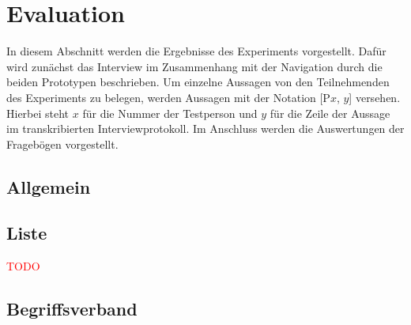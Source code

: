 \section{Evaluation}\label{sec:results}
In diesem Abschnitt werden die Ergebnisse des Experiments vorgestellt.
Dafür wird zunächst das Interview im Zusammenhang mit der Navigation durch die beiden Prototypen beschrieben.
Um einzelne Aussagen von den Teilnehmenden des Experiments zu belegen, werden Aussagen mit der Notation [P$x$, $y$] versehen.
Hierbei steht $x$ für die Nummer der Testperson und $y$ für die Zeile der Aussage im transkribierten Interviewprotokoll.
Im Anschluss werden die Auswertungen der Fragebögen vorgestellt.

\subsection{Allgemein}







\subsection{Liste}
\textcolor{red}{TODO}






\subsection{Begriffsverband}

